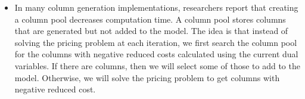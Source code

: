 \begin{enumerate}
\begin{itemize}
  \item In many column generation implementations, researchers report that 
    creating a column pool decreases computation time. A column pool stores
    columns that are generated but not added to the model. The idea is that 
    instead of solving the pricing problem at each iteration, we first search 
    the column pool for the columns with negative reduced costs calculated using 
    the current dual variables. If there are columns, then we will select some 
    of those to add to the model. Otherwise, we will solve the pricing problem
    to get columns with negative reduced cost. 
   

\end{itemize}
\end{enumerate}
